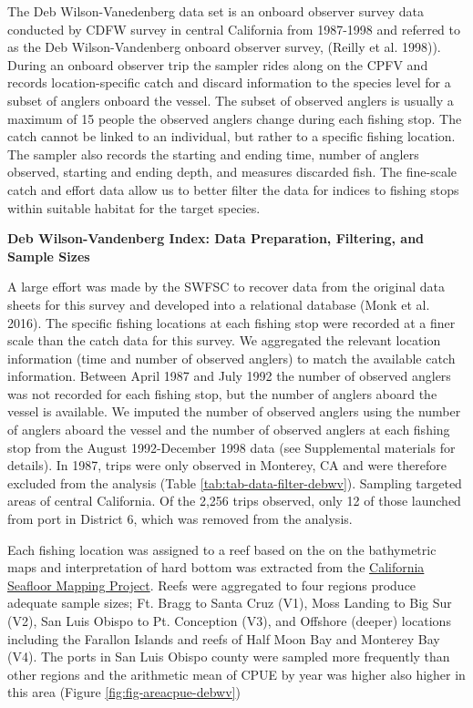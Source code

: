 \documentclass[
  english,
  a4paper,
]{article}
\begin{document}
The Deb Wilson-Vanedenberg data set is an onboard observer survey data conducted
by CDFW survey in central California from 1987-1998 and referred to as the Deb
Wilson-Vandenberg onboard observer survey, (Reilly et al. 1998)). During an onboard
observer trip the sampler rides along on the CPFV and records location-specific
catch and discard information to the species level for a subset of anglers
onboard the vessel. The subset of observed anglers is usually a maximum of 15
people the observed anglers change during each fishing stop. The catch cannot be
linked to an individual, but rather to a specific fishing location. The sampler
also records the starting and ending time, number of anglers observed, starting
and ending depth, and measures discarded fish. The fine-scale catch and effort
data allow us to better filter the data for indices
to fishing stops within suitable habitat for the target species.

\textbf{Deb Wilson-Vandenberg Index: Data Preparation, Filtering, and Sample Sizes}

A large effort was made by the SWFSC to recover data from the original data
sheets for this survey and developed into a relational database (Monk et al. 2016).
The specific fishing locations at each fishing stop were recorded at a finer
scale than the catch data for this survey. We aggregated the relevant location
information (time and number of observed anglers) to match the available catch
information. Between April 1987 and July 1992 the number of observed anglers
was not recorded for each fishing stop, but the number of anglers aboard the
vessel is available. We imputed the number of observed anglers using the number
of anglers aboard the vessel and the number of observed anglers at each fishing
stop from the August 1992-December 1998 data (see Supplemental materials for
details). In 1987, trips were only observed in Monterey, CA and were therefore
excluded from the analysis (Table \ref{tab:tab-data-filter-debwv}). Sampling
targeted areas of central California. Of the 2,256 trips observed, only 12 of
those launched from port in District 6, which was removed from the analysis.

Each fishing location was assigned to a reef based on the on the bathymetric maps
and interpretation of hard bottom was extracted from
the \href{http://seafloor.otterlabs.org/index.html}{California Seafloor Mapping Project}.
Reefs were aggregated to four regions produce adequate sample sizes;
Ft. Bragg to Santa Cruz (V1), Moss Landing to Big Sur (V2), San Luis Obispo to
Pt. Conception (V3), and Offshore (deeper) locations including the Farallon
Islands and reefs of Half Moon Bay and Monterey Bay (V4). The ports in San
Luis Obispo county were sampled more frequently than other regions and the arithmetic
mean of CPUE by year was higher also higher in this area (Figure \ref{fig:fig-areacpue-debwv})
\end{document}
